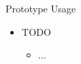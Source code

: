 \begin{Slide}{Prototype Usage}
\begin{itemize}
\item TODO
\begin{itemize}
\item ...

\end{itemize}
\end{itemize}
\end{Slide}